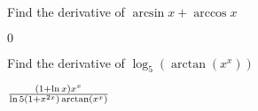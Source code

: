 \begin{exercises}
\begin{exercise} Find the derivative of $\arcsin x + \arccos x$
\begin{answer} $0$
\end{answer}\end{exercise}

\begin{exercise} Find the derivative of $\log _5 (\arctan (x^x ) )$
\begin{answer} ${(1+\ln x)x^x\over\ln5(1+x^{2x})\arctan(x^x)}$
\end{answer}\end{exercise}

\end{exercises}


















